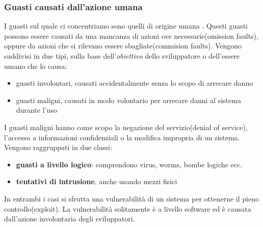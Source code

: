  \subsubsection{Guasti causati dall'azione umana}
 I guasti sul quale ci concentriamo sono quelli di origine umana . Questi guasti possono essere causati da una mancanza di 
 azioni ove necessarie(omission faults), oppure da azioni che si rilevano essere sbagliate(commision faults). Vengono
 suddivisi in due tipi, sulla base dell'\emph{obiettivo} dello sviluppatore o dell'essere umano che lo causa:
 \begin{itemize}
     \item guasti involontari, causati  accidentalmente senza lo scopo di arrecare danno
     \item guasti maligni, causati in modo volontario per arrecare danni al sistema durante l'uso
 \end{itemize}
 I guasti maligni hanno  come scopo la negazione del servizio(denial of service), l'accesso a informazioni confidenziali
 o la modifica impropria di un sistema.
 Vengono raggruppati in due classi:
 \begin{itemize}
     \item \textbf{guasti a livello logico}: comprendono virus, worms, bombe logiche ecc.
     \item \textbf{tentativi di intrusione}, anche usando mezzi fisici
 \end{itemize}
 In entrambi i casi si sfrutta una vulnerabilità di un sistema per ottenerne il pieno controllo(exploit).
 La vulnerabilità solitamente è a livello software ed è causata dall'azione involontaria degli sviluppatori.

